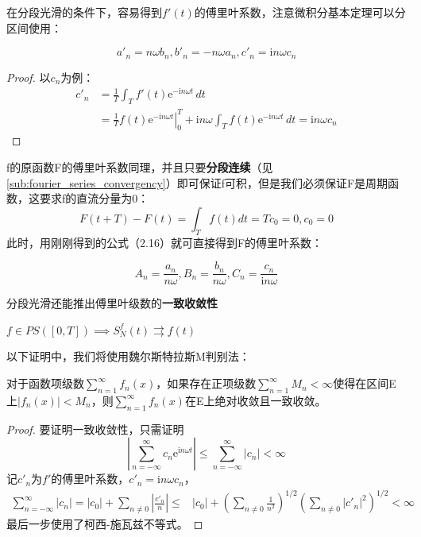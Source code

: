 \documentclass{ctexbook}
\newcommand{\evalat}[3]{\left.#1\right|_{#2}^{#3}}
\begin{document}
在分段光滑的条件下，容易得到$f'(t)$的傅里叶系数，注意微积分基本定理可以分区间使用：
\begin{proposition}[导函数的傅里叶系数]
    \begin{equation*}
    a'_n=n\omega b_n,b'_n=-n\omega a_n,c'_n=\mathrm{i}n\omega c_n
\end{equation*}
\end{proposition}
\begin{proof}
    以$c_n$为例：
\begin{align*}
    c'_n & =\frac{1}{T}\int_{T}f'(t)\mathrm{e}^{-\mathrm{i}n\omega t}\,dt\\
         & =\frac{1}{T}\evalat{f(t)\mathrm{e}^{-\mathrm{i}n\omega t}}{0}{T}+\mathrm{i}n\omega\int_{T}f(t)\mathrm{e}^{-\mathrm{i}n\omega t}\,dt=\mathrm{i}n\omega c_n
\end{align*}
\end{proof}

f的原函数F的傅里叶系数同理，并且只要\textbf{分段连续}（见\ref{sub:fourier_series_convergency}）即可保证f可积，但是我们必须保证F是周期函数，这要求f的直流分量为0：
\[F(t+T)-F(t)=\int_{T}f(t)dt=Tc_0=0,c_0=0\]
此时，用刚刚得到的公式（2.16）就可直接得到F的傅里叶系数：
\begin{proposition}[原函数的傅里叶系数]
    \begin{equation*}
    A_n=\frac{a_n}{n\omega},B_n=\frac{b_n}{n\omega},C_n=\frac{c_n}{\mathrm{i}n\omega}
\end{equation*}
\end{proposition}

分段光滑还能推出傅里叶级数的\textbf{一致收敛性}
\begin{theorem}
$f\in PS([0,T])\implies S_N^f(t)\rightrightarrows f(t)$
\end{theorem}
以下证明中，我们将使用魏尔斯特拉斯M判别法：
\begin{theorem}[M判别法]
    对于函数项级数$\sum_{n=1}^{\infty}f_n(x)$，如果存在正项级数$\sum_{n=1}^{\infty}M_n<\infty$使得在区间E上$|f_n(x)|<M_n$，则$\sum_{n=1}^{\infty}f_n(x)$在E上绝对收敛且一致收敛。
\end{theorem}
\begin{proof}
    要证明一致收敛性，只需证明
    $$\left|\sum_{n=-\infty}^{\infty}c_n \mathrm{e}^{\mathrm{i}n\omega t}\right|\leq \sum_{n=-\infty}^{\infty}|c_n|<\infty$$
    记$c'_n$为$f'$的傅里叶系数，$c'_n =\mathrm{i}n\omega c_n$，
    \begin{align*}
    \sum_{n=-\infty}^{\infty}|c_n|=|c_0|+\sum_{n\neq 0}\left| \frac{c'_n}{n}\right|\leq & |c_0|+\left(\sum_{n\neq 0}\frac{1}{n^2}\right)^{1/2}\left(\sum_{n\neq 0}|c'_n|^2\right)^{1/2}<\infty
\end{align*}
最后一步使用了柯西-施瓦兹不等式。
\end{proof}
\end{document}
